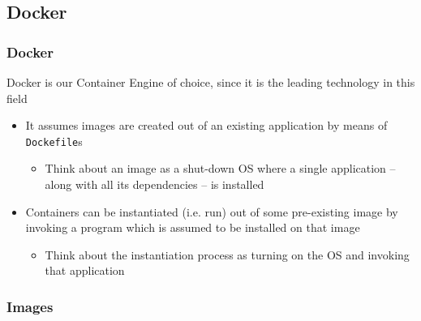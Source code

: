 \documentclass[handout]{beamer}\mode<presentation>{\usetheme{AMSCesenaBleu}}
\begin{document}
\subsection{Docker}

\begin{frame}
\frametitle{Docker}

    Docker is our Container Engine of choice, since it is the leading technology in this field
    \vfill{}\pause%
    \begin{itemize}
        \item It assumes images are created out of an existing application by means of \alert{\texttt{Dockefile}s}
        \pause
        \begin{itemize}
            \item Think about an image as a shut-down OS where a single application -- along with all its dependencies -- is installed
        \end{itemize}
        \pause
        \item Containers can be instantiated (i.e. \alert{run}) out of some pre-existing image by invoking a program which is assumed to be installed on that image
        \pause
        \begin{itemize}
            \item Think about the instantiation process as turning on the OS and invoking that application
        \end{itemize}

    \end{itemize}

\end{frame}

\subsubsection{Images}
\end{document}
